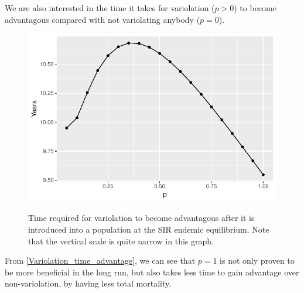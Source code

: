 \documentclass[12pt]{article}
\begin{document}
We are also interested in the time it takes for variolation ($p>0$) to become
advantagous compared with not variolating anybody ($p=0$).

\begin{figure}[H]
  \centering\label{Variolation_advantage}
  \includegraphics[width=1\textwidth]                 {Figures/Variolation_advantage_time.pdf}
  \caption{Time required for variolation to become advantagous after
    it is introduced into a population at the SIR endemic
    equilibrium.  Note that the vertical scale is quite narrow in this
  graph.}\label{Variolation_time_advantage}
\end{figure}

From \autoref{Variolation_time_advantage}, we can see that $p=1$ is not only proven to be more beneficial in the long run, but also takes less time to gain advantage over non-variolation, by having less total mortality.
\end{document}
